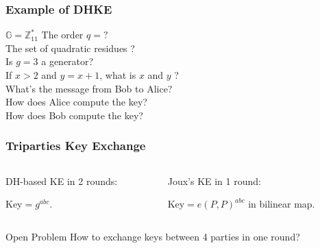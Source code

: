 \begin{frame}\frametitle{Example of DHKE}
\begin{exampleblock}{$\mathbb{G} = \mathbb{Z}^*_{11}$}
The order $q = ?$\\ %
The set of quadratic residues ?\\ %
Is $g = 3$ a generator? \\ %
If $x > 2$ and $y = x + 1$, what is $x$ and $y$ ?\\ %
What's the message from Bob to Alice?\\ %
How does Alice compute the key?\\ %
How does Bob compute the key? %
\end{exampleblock}
\end{frame}
\begin{frame}\frametitle{Triparties Key Exchange}
\begin{columns}[C]
\begin{column}{5cm}
\begin{center}
DH-based KE in 2 rounds:
\begin{figure}

\end{figure}
Key$=g^{abc}$.
\end{center}
\end{column}
\begin{column}{6cm}
\begin{center}
Joux's KE in 1 round:
\begin{figure}

\end{figure}
Key$=e(P,P)^{abc}$ in bilinear map.
\end{center}
\end{column}
\end{columns}
\begin{block}{Open Problem}
How to exchange keys between 4 parties in one round?
\end{block}
\end{frame}
